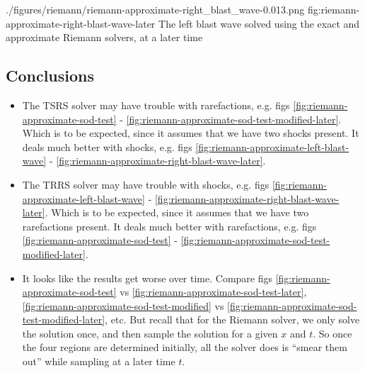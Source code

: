 \quickfigcap
	{./figures/riemann/riemann-approximate-right_blast_wave-0.013.png}
	{fig:riemann-approximate-right-blast-wave-later}
	{
		The left blast wave solved using the exact and approximate Riemann solvers, at a later time
	}
	




	
	
	
	
\subsection{Conclusions}
	
	
\begin{itemize}

	\item 	The TSRS solver may have trouble with rarefactions, e.g. figs \ref{fig:riemann-approximate-sod-test} - \ref{fig:riemann-approximate-sod-test-modified-later}.
			Which is to be expected, since it assumes that we have two shocks present.
			It deals much better with shocks, e.g. figs \ref{fig:riemann-approximate-left-blast-wave} - \ref{fig:riemann-approximate-right-blast-wave-later}.
	
	\item 	The TRRS solver may have trouble with shocks, e.g. figs \ref{fig:riemann-approximate-left-blast-wave} - \ref{fig:riemann-approximate-right-blast-wave-later}.
			Which is to be expected, since it assumes that we have two rarefactions present.
			It deals much better with rarefactions, e.g. figs \ref{fig:riemann-approximate-sod-test} - \ref{fig:riemann-approximate-sod-test-modified-later}.
			
			
	\item 	It looks like the results get worse over time.
			Compare figs \ref{fig:riemann-approximate-sod-test} vs \ref{fig:riemann-approximate-sod-test-later}, \ref{fig:riemann-approximate-sod-test-modified} vs \ref{fig:riemann-approximate-sod-test-modified-later}, etc.
			But recall that for the Riemann solver, we only solve the solution once, and then sample the solution for a given $x$ and $t$.
			So once the four regions are determined initially, all the solver does is ``smear them out'' while sampling at a later time $t$.
	
\end{itemize}
